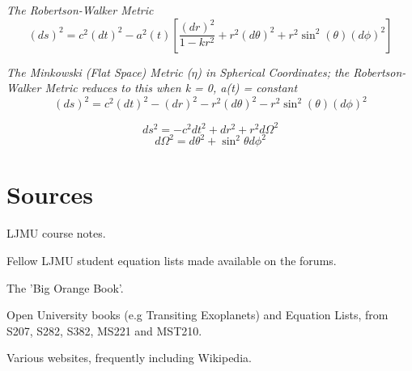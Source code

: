 \documentclass{spy}
\begin{document}
\textit {The Robertson-Walker Metric}
\begin{equation}
(ds)^2 = c^2 (dt)^2 - a^2(t) \left[ \frac {(dr)^2}{1-kr^2} + r^2(d\theta)^2 +r^2 \sin^2(\theta) (d\phi)^2 \right]
\end{equation}

\textit {The Minkowski (Flat Space) Metric (\(\eta\)) in Spherical Coordinates; the Robertson-Walker Metric reduces to this when k = 0, a(t) = constant}
\begin{equation}
(ds)^2 = c^2 (dt)^2 - (dr)^2 - r^2(d\theta)^2  - r^2 \sin^2(\theta) (d\phi)^2
\end{equation}
\begin{center}
\end{center}
\begin{equation}
ds^2 = - c^2 dt^2 + dr^2 +r^2 d\Omega^2
\end{equation}
\begin{equation}
d\Omega^2 = d\theta^2 + \sin^2\theta d\phi^2 
\end{equation}

\newpage

\section {Sources}
LJMU course notes.

Fellow LJMU student equation lists made available on the forums. 

The 'Big Orange Book'.

Open University books (e.g Transiting Exoplanets) and Equation Lists, from S207, S282, S382, MS221 and MST210.

Various websites, frequently including Wikipedia.


\end{document}
